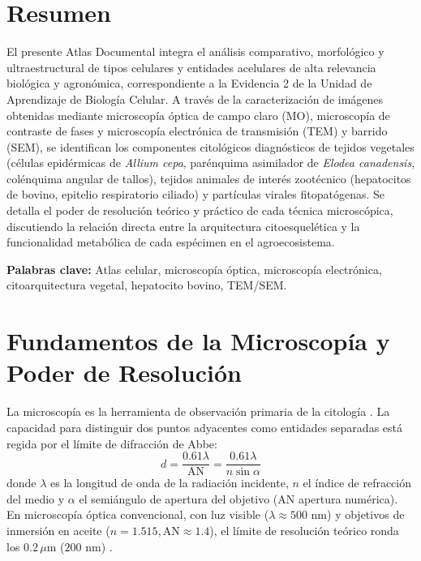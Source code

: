 \documentclass[12pt,spanish,letterpaper,oneside]{article}
\begin{document}
\hypersetup{pageanchor=false}
\begingroup
\fontsize{14}{17}\selectfont
\renewcommand{\Huge}{\fontsize{14}{17}\selectfont\bfseries}
\renewcommand{\large}{\fontsize{14}{17}\selectfont}
\templatePortrait
\clearpage
\endgroup
\hypersetup{pageanchor=true}
\templatePagecfg
\singlespacing
\setlength{\tabcolsep}{8pt}
\renewcommand{\arraystretch}{1.18}

\section*{Resumen}
El presente Atlas Documental integra el análisis comparativo, morfológico y ultraestructural de tipos celulares y entidades acelulares de alta relevancia biológica y agronómica, correspondiente a la Evidencia 2 de la Unidad de Aprendizaje de Biología Celular. A través de la caracterización de imágenes obtenidas mediante microscopía óptica de campo claro (MO), microscopía de contraste de fases y microscopía electrónica de transmisión (TEM) y barrido (SEM), se identifican los componentes citológicos diagnósticos de tejidos vegetales (células epidérmicas de \textit{Allium cepa}, parénquima asimilador de \textit{Elodea canadensis}, colénquima angular de tallos), tejidos animales de interés zootécnico (hepatocitos de bovino, epitelio respiratorio ciliado) y partículas virales fitopatógenas. Se detalla el poder de resolución teórico y práctico de cada técnica microscópica, discutiendo la relación directa entre la arquitectura citoesquelética y la funcionalidad metabólica de cada espécimen en el agroecosistema.

\vspace{0.4cm}
\noindent\textbf{Palabras clave:} Atlas celular, microscopía óptica, microscopía electrónica, citoarquitectura vegetal, hepatocito bovino, TEM/SEM.

\section{Fundamentos de la Microscopía y Poder de Resolución}
La microscopía es la herramienta de observación primaria de la citología \parencite{alberts2015}. La capacidad para distinguir dos puntos adyacentes como entidades separadas está regida por el límite de difracción de Abbe:
\begin{equation}
    d = \frac{0.61 \lambda}{\text{AN}} = \frac{0.61 \lambda}{n \sin \alpha}
\end{equation}
donde $\lambda$ es la longitud de onda de la radiación incidente, $n$ el índice de refracción del medio y $\alpha$ el semiángulo de apertura del objetivo ($\text{AN}$ apertura numérica). En microscopía óptica convencional, con luz visible ($\lambda \approx 500\text{ nm}$) y objetivos de inmersión en aceite ($n = 1.515, \text{AN} \approx 1.4$), el límite de resolución teórico ronda los $0.2\,\mu\text{m}$ ($200\text{ nm}$) \parencite{karp2014}.
\end{document}
